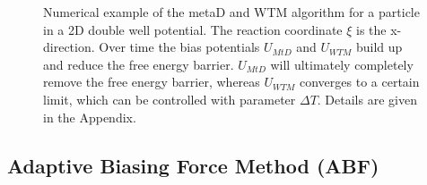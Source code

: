 \begin{figure}[H]
    \centering
    \caption{Numerical example of the metaD and WTM algorithm for a particle in a 2D double well potential. The reaction coordinate $\xi$ is the x-direction. Over time the bias potentials $U_{MtD}$ and $U_{WTM}$ build up and reduce the free energy barrier. $U_{MtD}$ will ultimately completely remove the free energy barrier, whereas $U_{WTM}$ converges to a certain limit, which can be controlled with parameter $\Delta T$. Details are given in the Appendix.}
\label{fig:metaD}%
\end{figure}

\subsection{Adaptive Biasing Force Method (ABF)}
\label{sec:ABF}

